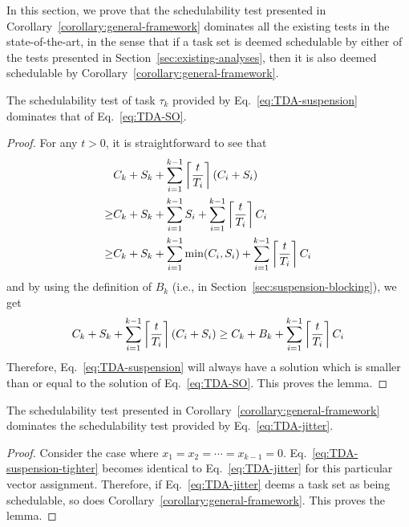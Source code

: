 
In this section, we prove that the schedulability test presented in Corollary~\ref{corollary:general-framework} dominates all the existing tests in the state-of-the-art, in the sense that if a task set is deemed schedulable by either of the tests presented in Section~\ref{sec:existing-analyses}, then it is also deemed schedulable by Corollary~\ref{corollary:general-framework}.

\begin{Lemma}
\label{lem:dominance_oblivious}
  The schedulability test of task $\tau_k$ provided by
  Eq.~\eqref{eq:TDA-suspension} dominates that of
  Eq.~\eqref{eq:TDA-SO}.
\end{Lemma}
\begin{proof}
For any $t > 0$, it is straightforward to see that
\begin{align*}
& C_k + S_k + \sum_{i=1}^{k-1}\left\lceil{\frac{t}{T_i}}\right\rceil (C_i + S_i) \\
 \geq & C_k + S_k + \sum_{i=1}^{k-1} S_i + \sum_{i=1}^{k-1}\left\lceil{\frac{t}{T_i}}\right\rceil C_i\\
 \geq & C_k + S_k + \sum_{i=1}^{k-1} \min(C_i, S_i) + \sum_{i=1}^{k-1}\left\lceil{\frac{t}{T_i}}\right\rceil C_i
\end{align*}
and by using the definition of $B_k$ (i.e., in Section~\ref{sec:suspension-blocking}), we get
\begin{align*}
C_k + S_k + \sum_{i=1}^{k-1}\left\lceil{\frac{t}{T_i}}\right\rceil (C_i + S_i) \geq C_k + B_k + \sum_{i=1}^{k-1}\left\lceil{\frac{t}{T_i}}\right\rceil C_i
\end{align*}
Therefore, Eq.~\eqref{eq:TDA-suspension} will always have a solution which is smaller than or equal to the solution of Eq.~\eqref{eq:TDA-SO}. This proves the lemma.
\end{proof}

\begin{Lemma}
  \label{lem:dominance_jitter}
  The schedulability test presented in
  Corollary~\ref{corollary:general-framework} dominates the
  schedulability test provided by Eq.~\eqref{eq:TDA-jitter}.
\end{Lemma}
\begin{proof}
  Consider the case where $x_1=x_2=\cdots=x_{k-1}=0$. Eq.~\eqref{eq:TDA-suspension-tighter} becomes identical to Eq.~\eqref{eq:TDA-jitter} for this particular vector assignment. Therefore, if Eq.~\eqref{eq:TDA-jitter} deems a task set as being schedulable, so does Corollary~\ref{corollary:general-framework}. This proves the lemma. 
\end{proof}
  

